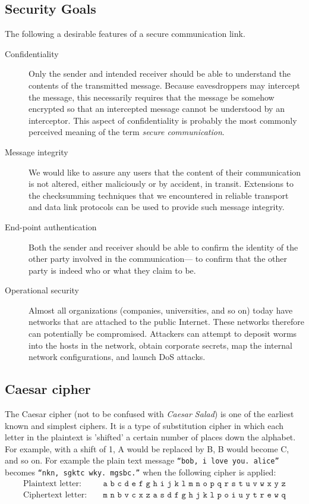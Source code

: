 \documentclass{article}
\begin{document}
\subsection*{Security Goals}
The following a desirable features of a secure communication link.
\begin{description}
    \item[Confidentiality] Only the sender and intended receiver should be able to understand
        the contents of the transmitted message. Because eavesdroppers may intercept
        the message, this necessarily requires that the message be somehow
        encrypted so that an intercepted message cannot be understood by an interceptor.
        This aspect of confidentiality is probably the most commonly perceived meaning of the term {\it secure communication}.
    \item[Message integrity] We would like to assure any users that the content of their communication
        is not altered, either maliciously or by accident, in transit. Extensions
        to the checksumming techniques that we encountered in reliable transport and
        data link protocols can be used to provide such message integrity.
    \item[End-point authentication] Both the sender and receiver should be able to
        confirm the identity of the other party involved in the communication—
        to confirm that the other party is indeed who or what they claim to be.
    \item[Operational security] Almost all organizations (companies, universities, and
        so on) today have networks that are attached to the public Internet. These networks
        therefore can potentially be compromised. Attackers can attempt
        to deposit worms into the hosts in the network, obtain corporate secrets, map
        the internal network configurations, and launch DoS attacks.
\end{description}

\subsection*{Caesar cipher}
The Caesar cipher (not to be confused with {\it Caesar Salad}) is one of the earliest known and simplest ciphers. It is a type of substitution cipher in which each letter in the plaintext is 'shifted' a certain number of places down the alphabet. For example, with a shift of 1, A would be replaced by B, B would become C, and so on. For example the plain text message \texttt{“bob, i love you. alice”} becomes \texttt{“nkn, sgktc wky. mgsbc.”} when the following cipher is applied:
\begin{align*}
    \text{Plaintext letter:} \, & \quad \texttt{a b c d e f g h i j k l m n o p q r s t u v w x y z} \\
    \text{Ciphertext letter:} \, & \quad \texttt{m n b v c x z a s d f g h j k l p o i u y t r e w q}
\end{align*}
\end{document}
